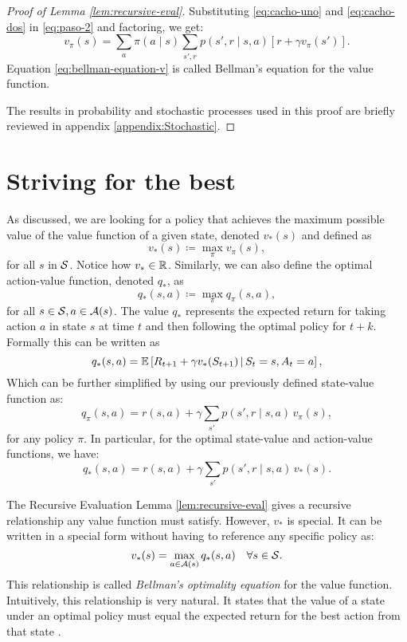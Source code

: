 \begin{proof}[Proof of Lemma \ref{lem:recursive-eval}]
	Substituting \eqref{eq:cacho-uno} and \eqref{eq:cacho-dos} in
	\eqref{eq:paso-2} and factoring, we get:
	\begin{equation}
		\label{eq:bellman-equation-v}
		v_\pi (s) = \sum_a \pi(a \mid s) \sum_{s', r} p(s', r \mid s, a) \left[ r + \gamma v_\pi (s') \right].
	\end{equation}
Equation \eqref{eq:bellman-equation-v} is called Bellman's equation for the
value function.

The results in probability and stochastic processes used in this proof are
briefly reviewed in appendix \ref{appendix:Stochastic}.
\end{proof}

\section{Striving for the best}

As discussed, we are looking for a policy that achieves the maximum possible value
of the value function of a given state, denoted $v_*(s)$ and defined as
\[
	v_* (s) \coloneqq \max_{\pi} v_\pi (s),
\]
for all $s$ in $\mathcal{S}$. Notice how $v_* \in \mathbb{R}$. Similarly, we can also
define the optimal action-value function, denoted $q_*$, as
\[
	q_* (s, a) \coloneqq \max_{\pi} q_\pi (s, a),
\]
for all $s \in \mathcal{S}, a \in \mathcal{A}(s)$. The value $q_*$ represents the
expected return for taking action $a$ in state $s$ at time $t$ and then
following the optimal policy for $t+k$. Formally this can be written as
\[
	q_{*} (s, a) = \mathbb{E} \left[ R_{t+1} + \gamma v_* (S_{t+1}) \,\middle\vert\, S_t = s, A_t = a \right],
\]
Which can be further simplified by using our previously defined state-value function as:
\begin{equation}
	\label{eq:q-by-v}
	q_\pi (s, a) = r(s, a) + \gamma \sum_{s'} p(s', r \mid s, a) \, v_\pi (s),
\end{equation}
for any policy $\pi$. In particular, for the optimal state-value and action-value functions, we have:
\begin{equation}
	q_*	(s, a) = r(s, a) + \gamma \sum_{s'} p(s', r \mid s, a) \, v_* (s).
\end{equation}

The Recursive Evaluation Lemma \ref{lem:recursive-eval} gives a recursive
relationship any value function must satisfy. However, $v_*$ is special. It can
be written in a special form \cite{bellman1957,SuttonBarto,raoRL4F} without
having to reference any specific policy as:
\begin{equation}
	\label{eq:prop-dependencia-vq}
	v_* (s) = \max_{a \in \mathcal{A}(s)} q_* (s, a) \quad \forall s \in \mathcal{S}.
\end{equation}
This relationship is called \textit{Bellman's optimality equation} for the value
function. Intuitively, this relationship is very natural. It states that the
value of a state under an optimal policy must equal the expected return for the
best action from that state \cite[Ch.~3.6]{SuttonBarto}.

